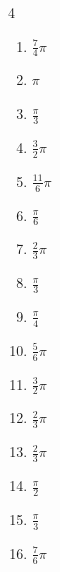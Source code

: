 \begin{multicols}{4}
\begin{enumerate}
  \item $\displaystyle \frac{7}{4}\pi$

  \item $\displaystyle \pi$

  \item $\displaystyle \frac{\pi}{3}$

  \item $\displaystyle \frac{3}{2}\pi$

  \item $\displaystyle \frac{11}{6}\pi$

  \item $\displaystyle \frac{\pi}{6}$

  \item $\displaystyle \frac{2}{3}\pi$

  \item $\displaystyle \frac{\pi}{3}$

  \item $\displaystyle \frac{\pi}{4}$

  \item $\displaystyle \frac{5}{6}\pi$

  \item $\displaystyle \frac{3}{2}\pi$

  \item $\displaystyle \frac{2}{3}\pi$

\columnbreak %

  \item $\displaystyle \frac{2}{3}\pi$

  \item $\displaystyle \frac{\pi}{2}$

  \item $\displaystyle \frac{\pi}{3}$

  \item $\displaystyle \frac{7}{6}\pi$


\end{enumerate}
\end{multicols}
